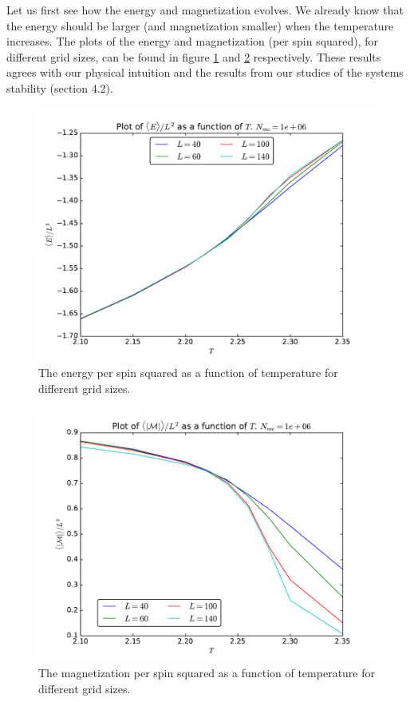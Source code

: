 \documentclass[12pt]{article}
\begin{document}
Let us first see how the energy and magnetization evolves. We already know that the energy should be larger (and magnetization smaller) when the temperature increases. The plots of the energy and magnetization (per spin squared), for different grid sizes, can be found in figure \ref{fig:parallell_energy} and \ref{fig:parallell_magnetization} respectively. These results agrees with our physical intuition and the results from our studies of the systems stability (section 4.2). 
\begin{figure}[H]
\centering
\includegraphics[width=\linewidth]{Plots/Energy_parallellization.pdf}\caption{The energy per spin squared as a function of temperature for different grid sizes.}
\label{fig:parallell_energy}
\end{figure}

\begin{figure}[H]
\centering
\includegraphics[width=\linewidth]{Plots/Magnetization_parallellization.pdf}
\caption{The magnetization per spin squared as a function of temperature for different grid sizes.}
\label{fig:parallell_magnetization}
\end{figure}
\end{document}
